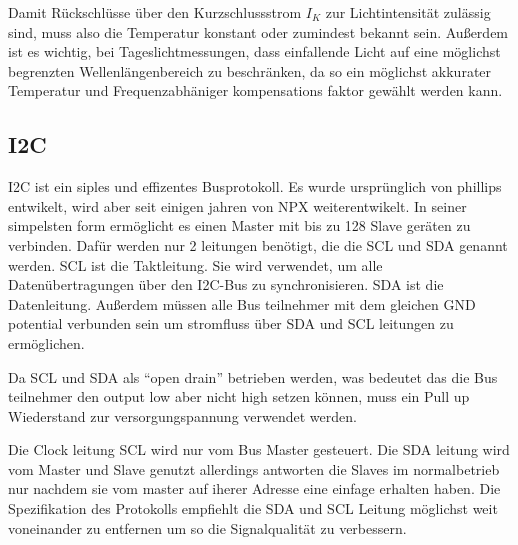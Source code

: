 \noindent Damit Rückschlüsse über den Kurzschlussstrom $I_K$ zur Lichtintensität zulässig sind, muss also die Temperatur konstant oder zumindest bekannt sein.
Außerdem ist es wichtig, bei Tageslichtmessungen, dass einfallende Licht auf eine möglichst begrenzten Wellenlängenbereich zu beschränken, da so ein möglichst akkurater Temperatur und Frequenzabhäniger kompensations faktor gewählt werden kann.
\subsection{I2C}
I2C ist ein siples und effizentes Busprotokoll.
Es wurde ursprünglich von phillips entwikelt, wird aber seit einigen jahren von NPX weiterentwikelt.
In seiner simpelsten form ermöglicht es einen Master mit bis zu 128 Slave geräten zu verbinden.
Dafür werden nur 2 leitungen benötigt, die die SCL und SDA genannt werden. SCL ist die Taktleitung. Sie wird verwendet, um alle Datenübertragungen über den I2C-Bus zu synchronisieren. SDA ist die Datenleitung.
Außerdem müssen alle Bus teilnehmer mit dem gleichen GND potential verbunden sein um stromfluss über SDA und SCL leitungen zu ermöglichen.


Da SCL und SDA als “open drain” betrieben werden, was bedeutet das die Bus teilnehmer den output low aber nicht high setzen können, muss ein Pull up Wiederstand zur versorgungspannung verwendet werden.

Die Clock leitung SCL wird nur vom Bus Master gesteuert.
Die SDA leitung wird vom Master und Slave genutzt allerdings antworten die Slaves im normalbetrieb nur nachdem sie vom master auf iherer Adresse eine einfage erhalten haben. 
Die Spezifikation des Protokolls empfiehlt die SDA und SCL Leitung möglichst weit voneinander zu entfernen um so die Signalqualität zu verbessern.


